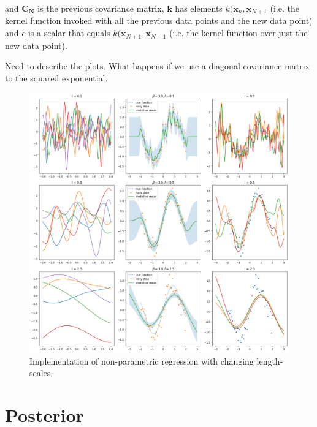 \documentclass[10pt, a4paper, twocolumn]{article} %
\begin{document}
and $\mathbf{C_N}$ is the previous covariance matrix, $\mathbf{k}$ has elements $k(\mathbf{x}_n, \mathbf{x}_{N+1}$ (i.e. the kernel function invoked with all the previous data points and the new data point) and $c$ is a scalar that equals $k(\mathbf{x}_{N+1}, \mathbf{x}_{N+1}$ (i.e. the kernel function over just the new data point).

Need to describe the plots. What happens if we use a diagonal covariance matrix to the squared exponential. 


\begin{figure}[!htb]
\centerline{\includegraphics[width=\linewidth]{non_parametric_regression.png}}
\caption{Implementation of non-parametric regression with changing length-scales. }
\label{fig2}
\end{figure}

\section{Posterior}
\end{document}
